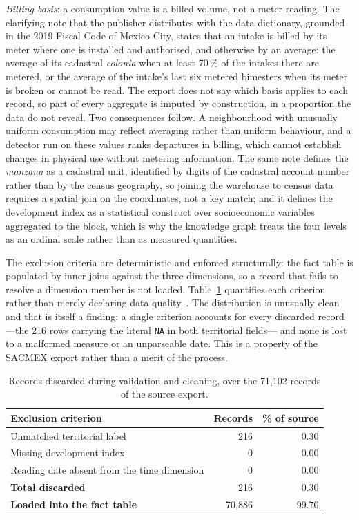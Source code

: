\documentclass[runningheads]{llncs}
\newif\ifmarcarcambios
\newenvironment{icokgblock}{\ifmarcarcambios\color{nuevo}\fi}{}
\newenvironment{nuevobloque}{}{}
\renewcommand{\_}{\origunderscore\allowbreak}
\begin{document}
\begin{icokgblock}
\begin{nuevobloque}
\emph{Billing basis}: a consumption value is a billed volume, not a meter reading.
The clarifying note that the publisher distributes with the data dictionary,
grounded in the 2019 Fiscal Code of Mexico City, states that an intake is billed
by its meter where one is installed and authorised, and otherwise by an average:
the average of its cadastral \emph{colonia} when at least 70\,\% of the intakes
there are metered, or the average of the intake's last six metered bimesters when
its meter is broken or cannot be read. The export does not say which basis
applies to each record, so part of every aggregate is imputed by construction,
in a proportion the data do not reveal. Two consequences follow. A neighbourhood
with unusually uniform consumption may reflect averaging rather than uniform
behaviour, and a detector run on these values ranks departures in billing, which
cannot establish changes in physical use without metering information. The same
note defines the \emph{manzana} as a cadastral unit, identified by digits of the
cadastral account number rather than by the census geography, so joining the
warehouse to census data requires a spatial join on the coordinates, not a key
match; and it defines the development index as a statistical construct over
socioeconomic variables aggregated to the block, which is why the knowledge graph
treats the four levels as an ordinal scale rather than as measured quantities.
\end{nuevobloque}

The exclusion criteria are deterministic and enforced structurally: the fact
table is populated by inner joins against the three dimensions, so a record that
fails to resolve a dimension member is not loaded. Table~\ref{tab:cleaning}
quantifies each criterion rather than merely declaring data
quality~\cite{vetro2016}. The distribution is unusually clean and that is itself
a finding: a single criterion accounts for every discarded record ---the 216 rows
carrying the literal \texttt{NA} in both territorial fields--- and none is lost
to a malformed measure or an unparseable date. This is a property of the SACMEX
export rather than a merit of the process.

\begin{table}[tbp]
\centering
\caption{Records discarded during validation and cleaning, over the 71,102
records of the source export.}
\label{tab:cleaning}
\begin{tabular}{lrr}
\hline
\textbf{Exclusion criterion} & \textbf{Records} & \textbf{\% of source} \\
\hline
Unmatched territorial label                 &    216 &  0.30 \\
Missing development index                   &      0 &  0.00 \\
Reading date absent from the time dimension &      0 &  0.00 \\
\hline
\textbf{Total discarded}                    &    216 &  0.30 \\
\textbf{Loaded into the fact table}         & 70,886 & 99.70 \\
\hline
\end{tabular}
\end{table}


\end{icokgblock}
\end{document}
